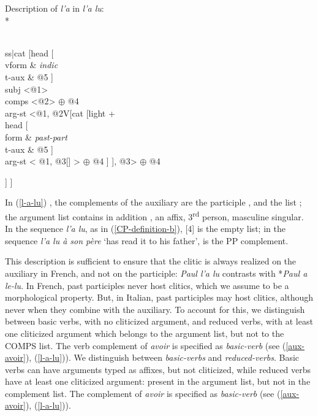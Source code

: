 \documentclass[output=paper]{langsci/langscibook}
\begin{document}
\ea
\label{l-a-lu}
Description of \textit{l'a }in \textit{l'a lu}:\\*
	\begin{avm}
		[{} morph [{}form & \textit{l'a} \\
		i-form & \textit{a} \\
		stem &   \textit{av-}
		] \\
		
		ss|cat [{}head [{}\\
		vform & \textit{indic} \\
		t-aux & @5
		]\\
		subj   <@1>  \\
		comps <@2> $\oplus$  @4\\
		arg-st <@1,  @2V[{}cat [{}light  +  \\
		head [{}\\
		form & \textit{past-part}\\
		t-aux  & @5                                             
		]\\
		arg-st < @1, @3[{}] > $\oplus$   @4  
		]
		], @3> $\oplus$ @4
		
		
		]
		]
		
	\end{avm}
\z



In (\ref{l-a-lu}) , the complements of the auxiliary are the participle , and the list ; the argument list contains in addition , an affix, 3\textsuperscript{rd} person, masculine singular. In the sequence \textit{l'a lu}, as in (\ref{CP-definition-b}), [4] is the empty list; in the sequence \textit{l'a lu \`a son p\`ere} `has read it to his father',  is the PP complement. 


This description is sufficient to ensure that the clitic is always realized on the auxiliary in French, and not on the participle: \textit{Paul l'a lu} contrasts with *\textit{Paul a le-lu}. In French, past participles never host clitics, which we assume to be a morphological property. But, in Italian, past participles may host clitics, although never when they combine with the auxiliary. To account for this, we distinguish between basic verbs, with no cliticized argument, and reduced verbs, with at least one cliticized argument which belongs to the argument list, but not to the COMPS list. The verb complement of \textit{avoir} is specified as \textit{basic-verb} (see (\ref{aux-avoir}), (\ref{l-a-lu})). 
We distinguish between \textit{basic-verbs} and \textit{reduced-verbs}. Basic verbs can have arguments typed as affixes, but not cliticized, while reduced verbs have at least one cliticized argument: present in the argument list, but not in the complement list. The complement of \textit{avoir} is specified as \textit{basic-verb} (see (\ref{aux-avoir}), (\ref{l-a-lu})). 
\end{document}
